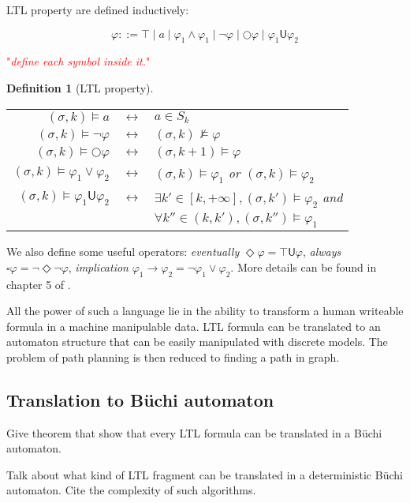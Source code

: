 \documentclass{article}
\newcommand\comment[1]{\textcolor{red}{"\textit{#1}"}}
\theoremstyle{named}
\newtheorem*{nameddefinition}{Definition}
\newcommand{\thmsymbol}{\( \blacktriangle \)}
\newenvironment{nameddef}[1]
    {\begin{samepage}
    \begin{nameddefinition}[#1]
    \renewcommand{\qedsymbol}{\thmsymbol}\pushQED{\qed}
    }
    {
    \popQED %
    \end{nameddefinition} 
    \end{samepage}
    }
\newcommand{\buchi}[0]{B\"uchi}
\newcommand{\LTLalways}		{\ensuremath{\square}}
\newcommand{\LTLeventually}	{\ensuremath{\Diamond}}
\newcommand{\LTLuntil}		{\ensuremath{\mathsf{U}}}
\newcommand{\LTLnext}		{\ensuremath{\bigcirc}}
\newcommand{\LTLimply}			{\ensuremath{\rightarrow}}
\newcommand{\true}			{\ensuremath{\top}}
\begin{document}
LTL property are defined inductively:

$$ \varphi ::= 
\true \mid 
a \mid 
\varphi_1 \land \varphi_1 \mid
\lnot \varphi \mid
\LTLnext \varphi \mid
\varphi_1 \LTLuntil \varphi_2$$

\comment{define each symbol inside it.}

\begin{nameddef}{LTL property}
\begin{tabular}[b]{rcl}
$(\sigma,k) \vDash a$ & $\leftrightarrow$ & $a \in S_k$\\
$(\sigma,k) \vDash \lnot \varphi$ & $\leftrightarrow$ &  $(\sigma,k) \nvDash  \varphi$ \\
$(\sigma,k) \vDash \LTLnext \varphi$ & $\leftrightarrow$ &  $(\sigma,k+1) \vDash  \varphi$ \\
$(\sigma,k) \vDash \varphi_1 \lor \varphi_2$ & $\leftrightarrow$ &  $(\sigma,k) \vDash  \varphi_1$ or $(\sigma,k) \vDash  \varphi_2$ \\
$(\sigma,k) \vDash \varphi_1 \LTLuntil \varphi_2$ & $\leftrightarrow$ &  $\exists k' \in \left [k, +\infty \right ] , (\sigma,k') \vDash \varphi_2$ and \\
& & $\forall k'' \in (k,k'), (\sigma,k'') \vDash \varphi_1$ \\
\end{tabular}
\end{nameddef}

We also define some useful operators: \textit{eventually} $\LTLeventually \varphi = \true \LTLuntil \varphi$, \textit{always} $\LTLalways \varphi = \lnot \LTLeventually \lnot \varphi$, \textit{implication} $\varphi_1 \LTLimply \varphi_2 = \lnot \varphi_1 \lor \varphi_2$.
More details can be found in chapter 5 of \cite{principlemodelchecking}.

All the power of such a language lie in the ability to transform a human writeable formula in a machine manipulable data. LTL formula can be translated to an automaton structure that can be easily manipulated with discrete models. The problem of path planning is then reduced to finding a path in graph.

\subsection{Translation to \buchi{} automaton}

Give theorem that show that every LTL formula can be translated in a \buchi{} automaton.

Talk about what kind of LTL fragment can be translated in a deterministic \buchi{} automaton.
Cite the complexity of such algorithms.
\end{document}

